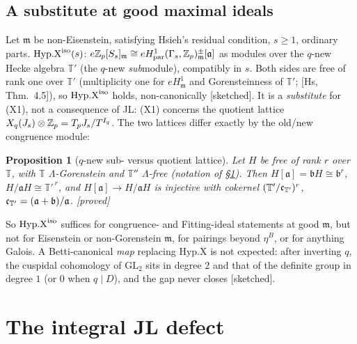 \documentclass[11pt]{amsart}
\theoremstyle{plain}
\newtheorem{proposition}[theorem]{Proposition}
\theoremstyle{definition}
\theoremstyle{remark}
\newcommand{\status}[1]{\textup{\textsf{[#1]}}}
\newcommand{\stproved}{\status{proved}}
\newcommand{\stsketch}{\status{sketched}}
\newcommand{\GL}{\mathrm{GL}}\newcommand{\SL}{\mathrm{SL}}\newcommand{\PGL}{\mathrm{PGL}}
\newcommand{\T}{\mathbb{T}}\newcommand{\m}{\mathfrak{m}}\newcommand{\cT}{\mathcal{T}}\newcommand{\cX}{\mathcal{X}}
\newcommand{\fa}{\mathfrak{a}}\newcommand{\fb}{\mathfrak{b}}
\begin{document}
\subsection{A substitute at good maximal ideals}
Let $\m$ be non-Eisenstein, satisfying Hsieh's residual condition, $s\ge1$, ordinary parts. $\mathrm{Hyp.X}^{\rm iso}(s)$: $e\Z_p[S_s]_\m\cong eH^1_{\rm par}(\Gamma_s,\Z_p)^{\pm}_\m[\fa]$ as modules over the $q$-new Hecke algebra $\T'$ (the $q$-new \emph{sub}module), compatibly in $s$. Both sides are free of rank one over $\T'$ (multiplicity one for $eH^1_\m$ and Gorensteinness of $\T'$; [Hs, Thm.~4.5]), so $\mathrm{Hyp.X}^{\rm iso}$ holds, non-canonically \stsketch. It is a \emph{substitute} for (X1), not a consequence of JL: (X1) concerns the quotient lattice $X_q(J_s)\otimes\mathbb{Z}_p=T_pJ_s/T^{I_q}$. The two lattices differ exactly by the old/new congruence module:

\begin{proposition}[$q$-new sub- versus quotient lattice]\label{prop:subquot}
Let $H$ be free of rank $r$ over $\T$, with $\T$ $\Lambda$-Gorenstein and $\T''$ $\Lambda$-free (notation of \S\ref{sec:defect}). Then $H[\fa]=\fb H\cong\fb^r$, $H/\fa H\cong\T'^{\,r}$, and $H[\fa]\to H/\fa H$ is injective with cokernel $(\T'/\cc_{\T'})^r$, $\cc_{\T'}=(\fa+\fb)/\fa$. \stproved
\end{proposition}
So $\mathrm{Hyp.X}^{\rm iso}$ suffices for congruence- and Fitting-ideal statements at good $\m$, but not for Eisenstein or non-Gorenstein $\m$, for pairings beyond $\eta^B$, or for anything Galois. A Betti-canonical \emph{map} replacing $\mathrm{Hyp.X}$ is not expected: after inverting $q$, the cuspidal cohomology of $\GL_2$ sits in degree $2$ and that of the definite group in degree $1$ (or $0$ when $q\mid D$), and the gap never closes \stsketch.

\section{The integral JL defect}\label{sec:defect}
\end{document}

